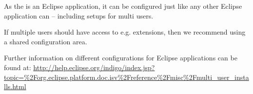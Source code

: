 As the \ite{} is an Eclipse application, it can be configured just like any other Eclipse application can -- including setups for multi users. 

If multiple users should have access to e.g. extensions, then we recommend using a shared configuration area. 

Further information on different configurations for Eclipse applications can be found at:
\url{http://help.eclipse.org/indigo/index.jsp?topic=\%2Forg.eclipse.platform.doc.isv\%2Freference\%2Fmisc\%2Fmulti_user_installs.html}
